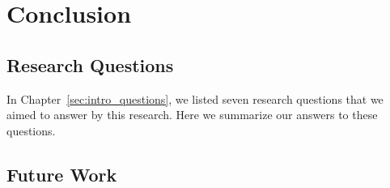 \chapter{Conclusion}
\label{chap:conclusion}

\section{Research Questions}

In Chapter~\ref{sec:intro_questions}, we listed seven research questions that we aimed to answer by this research.
Here we summarize our answers to these questions.

\section{Future Work}

